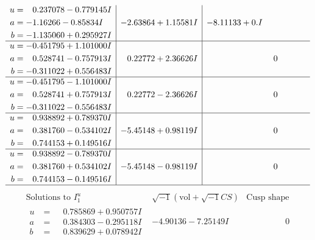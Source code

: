 \documentclass[1p]{elsarticle_modified}
\theoremstyle{definition}
\newcommand{\I}{\sqrt{-1}}
\begin{document}
$$\begin{array}{c|c|c}
\begin{aligned}
u &= \phantom{-}0.237078 - 0.779145 I \\
a &= -1.16266 - 0.85834 I \\
b &= -1.135060 + 0.295927 I\end{aligned}
 & -2.63864 + 1.15581 I & -8.11133 + 0. I\phantom{ +0.000000I} \\ \hline\begin{aligned}
u &= -0.451795 + 1.101000 I \\
a &= \phantom{-}0.528741 - 0.757913 I \\
b &= -0.311022 + 0.556483 I\end{aligned}
 & \phantom{-}0.22772 + 2.36626 I & \phantom{-0.000000 } 0 \\ \hline\begin{aligned}
u &= -0.451795 - 1.101000 I \\
a &= \phantom{-}0.528741 + 0.757913 I \\
b &= -0.311022 - 0.556483 I\end{aligned}
 & \phantom{-}0.22772 - 2.36626 I & \phantom{-0.000000 } 0 \\ \hline\begin{aligned}
u &= \phantom{-}0.938892 + 0.789370 I \\
a &= \phantom{-}0.381760 - 0.534102 I \\
b &= \phantom{-}0.744153 + 0.149516 I\end{aligned}
 & -5.45148 + 0.98119 I & \phantom{-0.000000 } 0 \\ \hline\begin{aligned}
u &= \phantom{-}0.938892 - 0.789370 I \\
a &= \phantom{-}0.381760 + 0.534102 I \\
b &= \phantom{-}0.744153 - 0.149516 I\end{aligned}
 & -5.45148 - 0.98119 I & \phantom{-0.000000 } 0\\
 \hline 
 \end{array}$$\newpage$$\begin{array}{c|c|c}  
\text{Solutions to }I^u_{1}& \I (\text{vol} + \sqrt{-1}CS) & \text{Cusp shape}\\
 \hline 
\begin{aligned}
u &= \phantom{-}0.785869 + 0.950757 I \\
a &= \phantom{-}0.384303 - 0.295118 I \\
b &= \phantom{-}0.839629 + 0.078942 I\end{aligned}
 & -4.90136 - 7.25149 I & \phantom{-0.000000 } 0 \\ \hline\begin{aligned}

\end{aligned}
\end{array}$$
\end{document}
